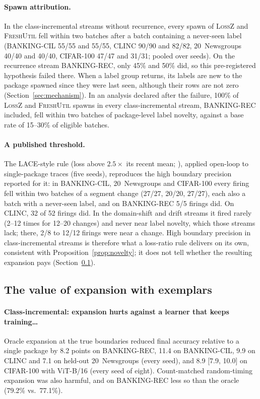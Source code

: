 \documentclass[10pt]{article}
\begin{document}
\paragraph{Spawn attribution.} In the class-incremental streams without recurrence, every spawn of \textsc{LossZ} and \textsc{FreshUtil} fell within two batches after a batch containing a never-seen label (BANKING-CIL 55/55 and 55/55, CLINC 90/90 and 82/82, 20~Newsgroups 40/40 and 40/40, CIFAR-100 47/47 and 31/31; pooled over seeds). On the recurrence stream BANKING-REC, only 45\% and 50\% did, so this pre-registered hypothesis failed there. When a label group returns, its labels are new to the package spawned since they were last seen, although their rows are not zero (Section~\ref{sec:mechanism}). In an analysis declared after the failure, 100\% of \textsc{LossZ} and \textsc{FreshUtil} spawns in every class-incremental stream, BANKING-REC included, fell within two batches of package-level label novelty, against a base rate of 15--30\% of eligible batches.

\paragraph{A published threshold.} The LACE-style rule (loss above $2.5\times$ its recent mean; \citealp{tathe2026lace}), applied open-loop to single-package traces (five seeds), reproduces the high boundary precision reported for it: in BANKING-CIL, 20~Newsgroups and CIFAR-100 every firing fell within two batches of a segment change (27/27, 20/20, 27/27), each also a batch with a never-seen label, and on BANKING-REC 5/5 firings did. On CLINC, 32 of 52 firings did. In the domain-shift and drift streams it fired rarely (2--12 times for 12--20 changes) and never near label novelty, which those streams lack; there, 2/8 to 12/12 firings were near a change. High boundary precision in class-incremental streams is therefore what a loss-ratio rule delivers on its own, consistent with Proposition~\ref{prop:novelty}; it does not tell whether the resulting expansion pays (Section~\ref{sec:res-exemplar}).

\subsection{The value of expansion with exemplars}
\label{sec:res-exemplar}
\paragraph{Class-incremental: expansion hurts against a learner that keeps training\ldots} Oracle expansion at the true boundaries reduced final accuracy relative to a single package by 8.2 points on BANKING-REC, 11.4 on BANKING-CIL, 9.9 on CLINC and 7.1 on held-out 20~Newsgroups (every seed), and 8.9 [7.9, 10.0] on CIFAR-100 with ViT-B/16 (every seed of eight). Count-matched random-timing expansion was also harmful, and on BANKING-REC less so than the oracle (79.2\% vs.\ 77.1\%).
\end{document}
